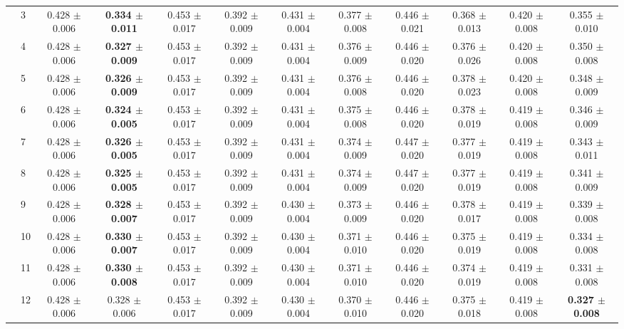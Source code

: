 \begin{table*}[t]
{\begin{tabular}{%
  ll
  @{\quad}
  c@{\hskip 4pt}c
  @{\quad\quad}
  c@{\hskip 4pt}c
  @{\quad\quad}
  c@{\hskip 4pt}c
  @{\quad\quad}
  c@{\hskip 4pt}c
  @{\quad\quad}
  c@{\hskip 4pt}c
}
        & 3 & 0.428 $\pm$ 0.006 & \textbf{0.334 $\pm$ 0.011} & 0.453 $\pm$ 0.017 & 0.392 $\pm$ 0.009 & 0.431 $\pm$ 0.004 & 0.377 $\pm$ 0.008 & 0.446 $\pm$ 0.021 & 0.368 $\pm$ 0.013 & 0.420 $\pm$ 0.008 & 0.355 $\pm$ 0.010 \\
        & 4 & 0.428 $\pm$ 0.006 & \textbf{0.327 $\pm$ 0.009} & 0.453 $\pm$ 0.017 & 0.392 $\pm$ 0.009 & 0.431 $\pm$ 0.004 & 0.376 $\pm$ 0.009 & 0.446 $\pm$ 0.020 & 0.376 $\pm$ 0.026 & 0.420 $\pm$ 0.008 & 0.350 $\pm$ 0.008 \\
        & 5 & 0.428 $\pm$ 0.006 & \textbf{0.326 $\pm$ 0.009} & 0.453 $\pm$ 0.017 & 0.392 $\pm$ 0.009 & 0.431 $\pm$ 0.004 & 0.376 $\pm$ 0.008 & 0.446 $\pm$ 0.020 & 0.378 $\pm$ 0.023 & 0.420 $\pm$ 0.008 & 0.348 $\pm$ 0.009 \\
        & 6 & 0.428 $\pm$ 0.006 & \textbf{0.324 $\pm$ 0.005} & 0.453 $\pm$ 0.017 & 0.392 $\pm$ 0.009 & 0.431 $\pm$ 0.004 & 0.375 $\pm$ 0.008 & 0.446 $\pm$ 0.020 & 0.378 $\pm$ 0.019 & 0.419 $\pm$ 0.008 & 0.346 $\pm$ 0.009 \\
        & 7 & 0.428 $\pm$ 0.006 & \textbf{0.326 $\pm$ 0.005} & 0.453 $\pm$ 0.017 & 0.392 $\pm$ 0.009 & 0.431 $\pm$ 0.004 & 0.374 $\pm$ 0.009 & 0.447 $\pm$ 0.020 & 0.377 $\pm$ 0.019 & 0.419 $\pm$ 0.008 & 0.343 $\pm$ 0.011 \\
        & 8 & 0.428 $\pm$ 0.006 & \textbf{0.325 $\pm$ 0.005} & 0.453 $\pm$ 0.017 & 0.392 $\pm$ 0.009 & 0.431 $\pm$ 0.004 & 0.374 $\pm$ 0.009 & 0.447 $\pm$ 0.020 & 0.377 $\pm$ 0.019 & 0.419 $\pm$ 0.008 & 0.341 $\pm$ 0.009 \\
        & 9 & 0.428 $\pm$ 0.006 & \textbf{0.328 $\pm$ 0.007} & 0.453 $\pm$ 0.017 & 0.392 $\pm$ 0.009 & 0.430 $\pm$ 0.004 & 0.373 $\pm$ 0.009 & 0.446 $\pm$ 0.020 & 0.378 $\pm$ 0.017 & 0.419 $\pm$ 0.008 & 0.339 $\pm$ 0.008 \\
        & 10 & 0.428 $\pm$ 0.006 & \textbf{0.330 $\pm$ 0.007} & 0.453 $\pm$ 0.017 & 0.392 $\pm$ 0.009 & 0.430 $\pm$ 0.004 & 0.371 $\pm$ 0.010 & 0.446 $\pm$ 0.020 & 0.375 $\pm$ 0.019 & 0.419 $\pm$ 0.008 & 0.334 $\pm$ 0.008 \\
        & 11 & 0.428 $\pm$ 0.006 & \textbf{0.330 $\pm$ 0.008} & 0.453 $\pm$ 0.017 & 0.392 $\pm$ 0.009 & 0.430 $\pm$ 0.004 & 0.371 $\pm$ 0.010 & 0.446 $\pm$ 0.020 & 0.374 $\pm$ 0.019 & 0.419 $\pm$ 0.008 & 0.331 $\pm$ 0.008 \\
        & 12 & 0.428 $\pm$ 0.006 & 0.328 $\pm$ 0.006 & 0.453 $\pm$ 0.017 & 0.392 $\pm$ 0.009 & 0.430 $\pm$ 0.004 & 0.370 $\pm$ 0.010 & 0.446 $\pm$ 0.020 & 0.375 $\pm$ 0.018 & 0.419 $\pm$ 0.008 & \textbf{0.327 $\pm$ 0.008} \\

\end{tabular}}
\end{table*}

